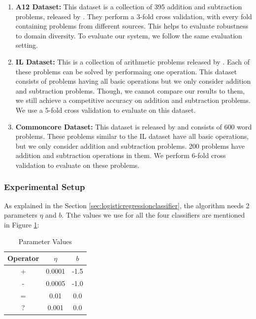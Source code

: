 \documentclass[11pt]{article}
\begin{document}
\begin{enumerate}
\item \textbf{A12 Dataset:} This dataset is a collection of 395 addition and subtraction problems, released by \citep{ARIS}. They perform a 3-fold cross validation, with every fold containing problems from different sources. This helps to evaluate robustness to domain diversity. To evaluate our system, we follow the same evaluation setting.

\item \textbf{IL Dataset:} This is a collection of arithmetic problems released by \citep{RoyTACL15}. Each of these problems can be solved by performaing one operation. This dataset consists of problems having all basic operations but we only consider addition and subtraction problems. Though, we cannot compare our results to them, we still achieve a competitive accuracy on addition and subtraction problems. We use a 5-fold cross validation to evaluate on this dataset.

\item \textbf{Commoncore Dataset:} This dataset is released by \citep{RoyR15} and consists of 600 word problems. These problems similar to the IL dataset have all basic operations, but we only consider addition and subtraction problems. 200 problems have addition and subtraction operations in them. We perform 6-fold cross validation to evaluate on these problems.
\end{enumerate}


\subsubsection{Experimental Setup}\label{sec:experimentalsetup}
As explained in the Section \ref{sec:logisticregressionclassifier}, the algorithm needs 2 parameters \begin{math}\eta\end{math} and \begin{math}b\end{math}. Tthe values we use for all the four classifiers are mentioned in Figure \ref{figure:23}:

\begin{table}[h]
\begin{center}
\begin{tabular}{|c|c|c|}
\hline
\textbf{Operator} & \begin{math}\eta\end{math} & \begin{math}b\end{math} \\
\hline
+ & 0.0001 & -1.5 \\
\hline
- & 0.0005 & -1.0\\
\hline
= & 0.01 & 0.0\\
\hline
? & 0.001 & 0.0\\
\hline
\end{tabular}
\end{center}
\label{figure:23}
\caption{Parameter Values}
\end{table}
\end{document}
